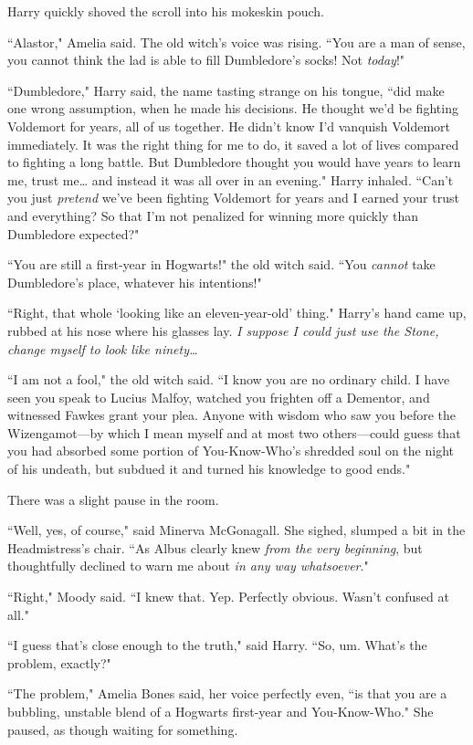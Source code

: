 Harry quickly shoved the scroll into his mokeskin pouch.

``Alastor," Amelia said. The old witch's voice was rising. ``You are a man of sense, you cannot think the lad is able to fill Dumbledore's socks! Not \emph{today}!"

``Dumbledore," Harry said, the name tasting strange on his tongue, ``did make one wrong assumption, when he made his decisions. He thought we'd be fighting Voldemort for years, all of us together. He didn't know I'd vanquish Voldemort immediately. It was the right thing for me to do, it saved a lot of lives compared to fighting a long battle. But Dumbledore thought you would have years to learn me, trust me{\ldots} and instead it was all over in an evening." Harry inhaled. ``Can't you just \emph{pretend} we've been fighting Voldemort for years and I earned your trust and everything? So that I'm not penalized for winning more quickly than Dumbledore expected?"

``You are still a first-year in Hogwarts!" the old witch said. ``You \emph{cannot} take Dumbledore's place, whatever his intentions!"

``Right, that whole `looking like an eleven-year-old' thing." Harry's hand came up, rubbed at his nose where his glasses lay. \emph{I suppose I could just use the Stone, change myself to look like ninety{\ldots}}

``I am not a fool," the old witch said. ``I know you are no ordinary child. I have seen you speak to Lucius Malfoy, watched you frighten off a Dementor, and witnessed Fawkes grant your plea. Anyone with wisdom who saw you before the Wizengamot---by which I mean myself and at most two others---could guess that you had absorbed some portion of You-Know-Who's shredded soul on the night of his undeath, but subdued it and turned his knowledge to good ends."

There was a slight pause in the room.

``Well, yes, of course," said Minerva McGonagall. She sighed, slumped a bit in the Headmistress's chair. ``As Albus clearly knew \emph{from the very beginning}, but thoughtfully declined to warn me about \emph{in any way whatsoever}."

``Right," Moody said. ``I knew that. Yep. Perfectly obvious. Wasn't confused at all."

``I guess that's close enough to the truth," said Harry. ``So, um. What's the problem, exactly?"

``The problem," Amelia Bones said, her voice perfectly even, ``is that you are a bubbling, unstable blend of a Hogwarts first-year and You-Know-Who." She paused, as though waiting for something.

